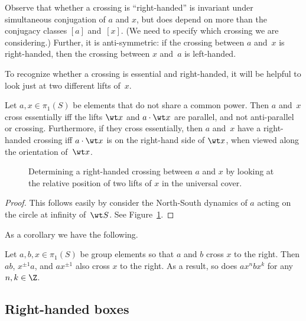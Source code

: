 Observe that whether a crossing is ``right-handed'' is invariant under
simultaneous conjugation of $a$ and $x$, but does depend on
more than the conjugacy classes $[a]$ and~$[x]$. (We need to specify
which crossing we are considering.) Further, it is anti-symmetric: if
the crossing between $a$ and~$x$ is right-handed, then the crossing
between $x$ and~$a$ is left-handed. 

To recognize whether a crossing is essential and right-handed, it will
be helpful to look just at two different lifts of~$x$.

\begin{lemma}
  Let $a,x \in \pi_1(S)$ be elements that do not share a common power.
  Then $a$ and~$x$ cross essentially iff the lifts $\wt x$ and
  $a \cdot \wt x$ are parallel, and not anti-parallel or crossing.
  Furthermore, if they cross essentially, then $a$ and~$x$ have a
  right-handed crossing iff $a \cdot \wt x$ is on the right-hand side
  of $\wt x$, when viewed along the orientation of~$\wt x$.
  \label{lem:rhs}
\end{lemma}

  \begin{figure}
\caption{Determining a right-handed crossing between $a$ and $x$ by looking at the relative position of two lifts of $x$ in the universal cover.}
\label{fig:rhc}
\end{figure}

\begin{proof}
  This follows easily by consider the North-South dynamics of $a$
  acting on the circle at infinity of~$\wt S$. See Figure~\ref{fig:rhc}.
\end{proof}

As a corollary we have the following.

\begin{lemma}
  Let $a,b,x \in \pi_1(S)$ be group elements so that $a$ and $b$ cross
  $x$ to the right. Then $ab$, $x^{\pm 1}a$, and $ax^{\pm 1}$ also cross $x$ to the
  right. As a result, so does $ax^nbx^k$ for any $n,k \in \Z$.
  \label{lem:rhs_prod}
\end{lemma}

\subsection{Right-handed boxes}
\label{sec:boxes}

